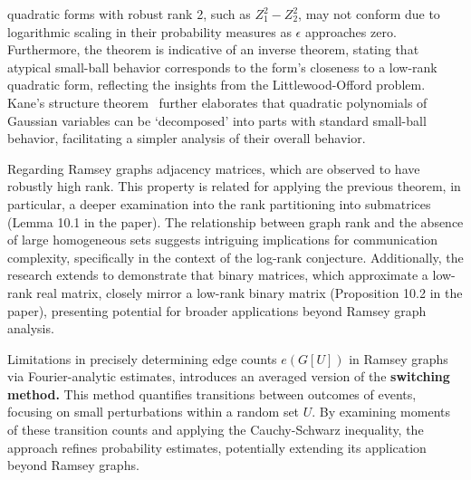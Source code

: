 quadratic forms with robust rank 2, such as \( Z_1^2 - Z_2^2 \),
may not conform due to logarithmic scaling in their probability measures as \( \epsilon \)
approaches zero. 
Furthermore, the theorem is indicative of an inverse theorem,
stating that atypical small-ball behavior corresponds to the form's
closeness to a low-rank quadratic form, 
reflecting the insights from the Littlewood-Offord problem.
Kane's structure theorem~\cite{kane2017structure} further elaborates that quadratic polynomials
of Gaussian variables can be `decomposed' into parts with standard small-ball behavior,
facilitating a simpler analysis of their overall behavior.

Regarding Ramsey graphs adjacency matrices,
which are observed to have robustly high rank.
This property is related for applying the previous theorem,
in particular, a deeper examination into the rank
partitioning into submatrices (Lemma 10.1 in the paper).
The relationship between graph rank and the absence of large homogeneous sets suggests
intriguing implications for communication complexity,
specifically in the context of the log-rank conjecture.
Additionally, the research extends to demonstrate that binary matrices,
which approximate a low-rank real matrix,
closely mirror a low-rank binary matrix (Proposition 10.2 in the paper),
presenting potential for broader applications beyond Ramsey graph analysis.

Limitations in precisely determining edge counts \(e(G[U])\)
in Ramsey graphs via Fourier-analytic estimates,
introduces an averaged version of the \textbf{switching method.}
This method quantifies transitions between outcomes of events, focusing on small
perturbations within a random set \(U\). By examining moments of these transition
counts and applying the Cauchy-Schwarz inequality, the approach refines probability
estimates, potentially extending its application beyond Ramsey graphs.

